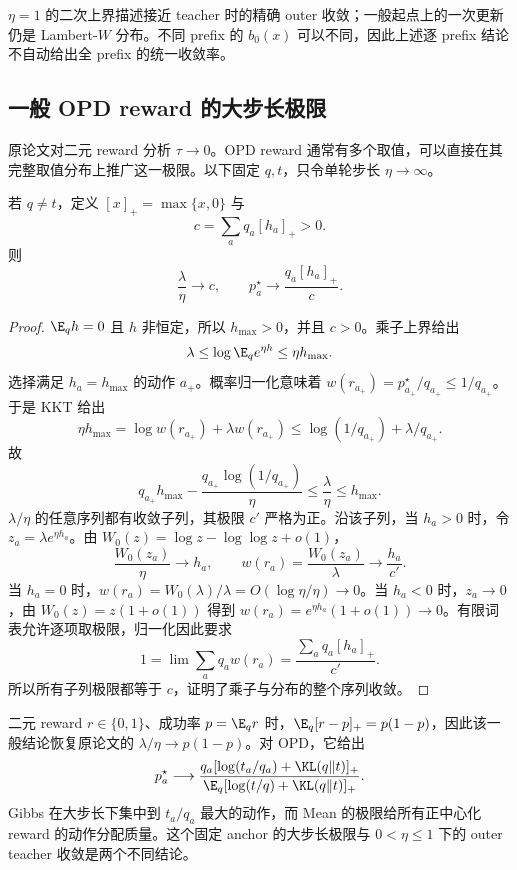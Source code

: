 $\eta=1$ 的二次上界描述接近 teacher 时的精确 outer 收敛；一般起点上的一次更新仍是 Lambert-$W$ 分布。不同 prefix 的 $b_0(x)$ 可以不同，因此上述逐 prefix 结论不自动给出全 prefix 的统一收敛率。

\subsection{一般 OPD reward 的大步长极限}

原论文对二元 reward 分析 $\tau\to0$。OPD reward 通常有多个取值，可以直接在其完整取值分布上推广这一极限。以下固定 $q,t$，只令单轮步长 $\eta\to\infty$。

\begin{proposition}
\label{prop:mean-opd-large-eta}
若 $q\ne t$，定义 $[x]_+=\max\{x,0\}$ 与
\[
 c=\sum_aq_a[h_a]_+>0.
\]
则
\begin{equation}
 \frac{\lambda}{\eta}\longrightarrow c,
 \qquad
 p_a^\star\longrightarrow\frac{q_a[h_a]_+}{c}.
 \label{eq:mean-opd-large-eta}
\end{equation}
\end{proposition}

\begin{proof}
$\E_qh=0$ 且 $h$ 非恒定，所以 $h_{\max}>0$，并且 $c>0$。乘子上界给出
\[
 \lambda\le\log\E_qe^{\eta h}\le\eta h_{\max}.
\]
选择满足 $h_a=h_{\max}$ 的动作 $a_+$。概率归一化意味着 $w(r_{a_+})=p_{a_+}^\star/q_{a_+}\le1/q_{a_+}$。于是 KKT 给出
\[
 \eta h_{\max}
 =\log w(r_{a_+})+\lambda w(r_{a_+})
 \le\log(1/q_{a_+})+\lambda/q_{a_+}.
\]
故
\[
 q_{a_+}h_{\max}-\frac{q_{a_+}\log(1/q_{a_+})}{\eta}
 \le\frac{\lambda}{\eta}\le h_{\max}.
\]
$\lambda/\eta$ 的任意序列都有收敛子列，其极限 $c'$ 严格为正。沿该子列，当 $h_a>0$ 时，令 $z_a=\lambda e^{\eta h_a}$。由 $W_0(z)=\log z-\log\log z+o(1)$，
\[
 \frac{W_0(z_a)}{\eta}\to h_a,
 \qquad w(r_a)=\frac{W_0(z_a)}{\lambda}\to\frac{h_a}{c'}.
\]
当 $h_a=0$ 时，$w(r_a)=W_0(\lambda)/\lambda=O(\log\eta/\eta)\to0$。当 $h_a<0$ 时，$z_a\to0$，由 $W_0(z)=z(1+o(1))$ 得到 $w(r_a)=e^{\eta h_a}(1+o(1))\to0$。有限词表允许逐项取极限，归一化因此要求
\[
 1=\lim\sum_aq_aw(r_a)=\frac{\sum_aq_a[h_a]_+}{c'}.
\]
所以所有子列极限都等于 $c$，证明了乘子与分布的整个序列收敛。
\end{proof}

二元 reward $r\in\{0,1\}$、成功率 $p=\E_qr$ 时，$\E_q[r-p]_+=p(1-p)$，因此该一般结论恢复原论文的 $\lambda/\eta\to p(1-p)$。对 OPD，它给出
\[
 p_a^\star\longrightarrow
 \frac{q_a[\log(t_a/q_a)+\KL(q\Vert t)]_+}
 {\E_q[\log(t/q)+\KL(q\Vert t)]_+}.
\]
Gibbs 在大步长下集中到 $t_a/q_a$ 最大的动作，而 Mean 的极限给所有正中心化 reward 的动作分配质量。这个固定 anchor 的大步长极限与 $0<\eta\le1$ 下的 outer teacher 收敛是两个不同结论。

